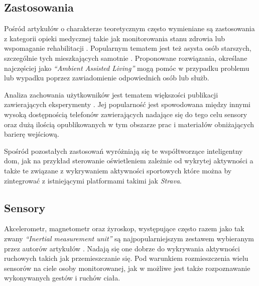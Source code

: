 \subsection{Zastosowania}
Pośród artykułów o charakterze teoretycznym często wymieniane są zastosowania z kategorii opieki medycznej takie jak monitorowania stanu zdrowia \cite{22_HAR_Survey_Ultrasonic} lub wspomaganie rehabilitacji \cite{35_HAR_Wearable_Review}. Popularnym tematem jest też asysta osób starszych, szczególnie tych mieszkających samotnie \cite{21_HAR_Smartphone}. Proponowane rozwiązania, określane najczęściej jako \textit{``Ambient Assisted Living''} mogą pomóc w przypadku problemu lub wypadku poprzez zawiadomienie odpowiednich osób lub służb.

Analiza zachowania użytkowników jest tematem większości publikacji zawierających eksperymenty \cite{2_Real_Time_HAR, 59_Air_Pressure_HAR, 33_Inertial_Study}. Jej popularność jest spowodowana między innymi wysoką dostępnością telefonów zawierających nadające się do tego celu sensory oraz dużą ilością opublikowanych w tym obszarze prac i materiałów obniżających barierę wejściową.

Spośród pozostałych zastosowań wyróżniają się te współtworzące inteligentny dom, jak na przykład sterowanie oświetleniem zależnie od wykrytej aktywności \cite{36_Smart_Home_HAR} a także te związane z wykrywaniem aktywności sportowych \cite{29_Daily_Sport_HAR} które można by zintegrować z istniejącymi platformami takimi jak \textit{Strava}.


\subsection{Sensory}
Akcelerometr, magnetometr oraz żyroskop, występujące często razem jako tak zwany \textit{``Inertial measurement unit''} są najpopularniejszym zestawem wybieranym przez autorów artykułów \cite{30_Context_Awareness, 32_Accel_Phone_HAR}. Nadają się one dobrze do wykrywania aktywności ruchowych takich jak przemieszczanie się. Pod warunkiem rozmieszczenia wielu sensorów na ciele osoby monitorowanej, jak w \cite{29_Daily_Sport_HAR} możliwe jest także rozpoznawanie wykonywanych gestów i ruchów ciała.

